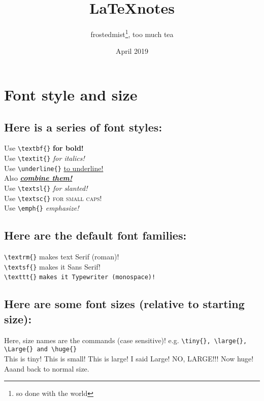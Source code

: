 \documentclass[12pt, letterpaper]{article} %
\title{\LaTeX notes} %
\author{frostedmist\thanks{so done with the world}, too much tea}
\date{April 2019} %
\begin{document}

\maketitle %

\section{Font style and size}

\subsection*{Here is a series of font styles:}

Use \verb+\textbf{}+ \textbf{for bold!} \\
Use \verb+\textit{}+ \textit{for italics!} \\
Use \verb+\underline{}+ \underline{to underline!} \\
Also \textbf{\textit{\underline{combine them!}}} \\
Use \verb+\textsl{}+ \textsl{for slanted!} \\
Use \verb+\textsc{}+ \textsc{for small caps!} \\
Use \verb+\emph{}+ \emph{emphasize!} %

\subsection*{Here are the default font families:}

\verb+\textrm{}+ \textrm{makes text Serif (roman)!} \\
\verb+\textsf{}+ \textsf{makes it Sans Serif!} \\
\verb+\texttt{}+ \texttt{makes it Typewriter (monospace)!} 

\subsection*{Here are some font sizes (relative to starting size):} 
Here, size names are the commands (case sensitive)! e.g. 
\verb+\tiny{}, \large{}, \Large{} and \huge{}+\\

\tiny{This is tiny!}
\small{This is small!}
\large{This is large!}
\Large{I said Large!}
\LARGE{NO, LARGE!!!}
\huge{Now huge!}
\normalsize{Aaand back to normal size.}
\end{document}

